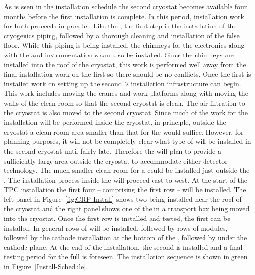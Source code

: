As is seen in the installation schedule the second cryostat becomes
available four months before the first  installation is
complete. In this period, installation work for both  
proceeds in parallel. Like the , the first step is
the installation of the cryogenics piping, followed by a thorough cleaning
and installation of the false floor. While this piping is being
installed, the  chimneys for the electronics along with the
 and  instrumentation \fdth{}s can also be installed. Since the
chimneys are installed into the roof of the cryostat,  this work is
performed well away from the final installation work on the first
 so there should be no conflicts. Once the first  is
installed work on setting up the second 's installation
infrastructure can begin. This work includes moving the cranes and
work platforms along with moving the walls of the clean room so that the
second cryostat is clean. The air filtration to the cryostat is also
moved to the second cryostat.  Since much of the work for the 
installation will be performed inside the cryostat, in principle, outside the cryostat a
clean room area smaller than that for the   would suffice. %
However, for
planning purposes, it will not be completely clear what type of 
will be installed in the second cryostat until fairly late. Therefore the 
will plan to provide a sufficiently large area outside the cryostat to
accommodate either detector technology.  %
The much smaller clean room for a  %
could be installed just
outside the . The installation process inside the  will
proceed east-to-west. At the start of the TPC installation the first
four  -- comprising the first row -- will be installed. %
The left panel in Figure~\ref{fig:CRP-Install} shows two 
being installed near the roof of the cryostat and the right panel
shows one of the  in a transport box being moved into the cryostat.
Once the first  row is installed and tested, %
the first  can be installed.%
In general rows of  will be installed, followed by rows of  modules, followed by the cathode installation at the bottom of the , followed by 
 under the cathode plane. 
At the end of the installation, the second  is
installed and a final testing period for the full  is
foreseen. The  installation sequence is shown in green in
Figure~\ref{Install-Schedule}.

